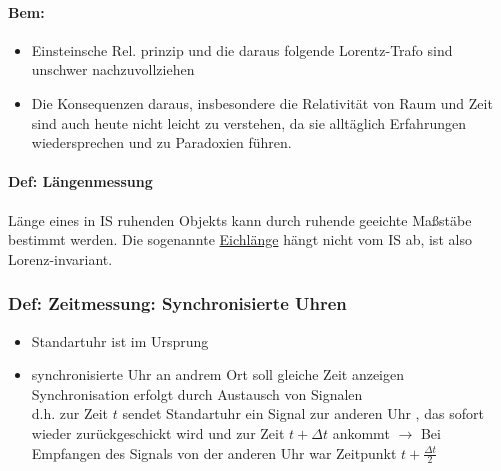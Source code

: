 \documentclass[titlepage,12pt,a4paper,ngerman]{report}
\begin{document}
\paragraph{Bem:}
\begin{itemize}
	\item Einsteinsche Rel. prinzip und die daraus folgende Lorentz-Trafo sind unschwer nachzuvollziehen
	\item Die Konsequenzen daraus, insbesondere die Relativität von Raum und Zeit sind auch heute nicht leicht zu verstehen, da sie alltäglich Erfahrungen wiedersprechen und zu Paradoxien führen.
\end{itemize}

\paragraph{Def: Längenmessung}
Länge eines in IS ruhenden Objekts kann durch ruhende geeichte Maßstäbe bestimmt werden. Die sogenannte \underline{Eichlänge} hängt nicht vom IS ab, ist also Lorenz-invariant.

\subsubsection{Def: Zeitmessung: Synchronisierte Uhren}


\begin{itemize}
	\item Standartuhr ist im Ursprung
	\item synchronisierte Uhr an andrem Ort soll gleiche Zeit anzeigen\\
	Synchronisation erfolgt durch Austausch von Signalen\\
	d.h. zur Zeit $ t $ sendet Standartuhr ein Signal zur anderen Uhr , das sofort wieder zurückgeschickt wird und zur Zeit $ t+\Delta t $ ankommt $ \rightarrow $ Bei Empfangen des Signals von der anderen Uhr war Zeitpunkt $ t + \frac{\Delta t}{2} $
\end{itemize}
\end{document}
